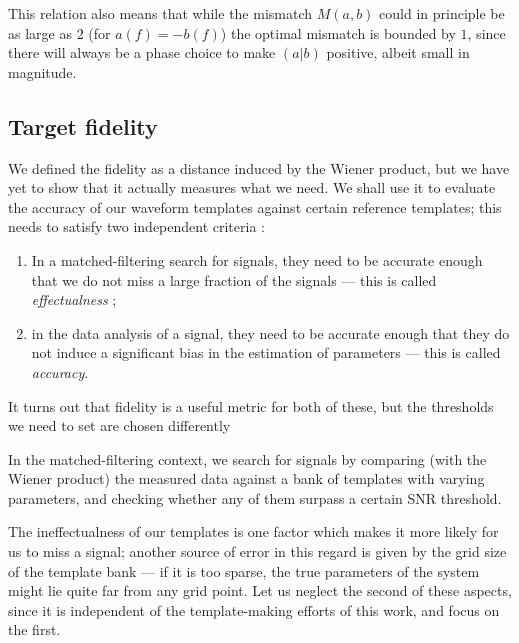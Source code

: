 \documentclass[main.tex]{subfiles}
\begin{document}
This relation also means that while the mismatch \(M(a, b)\) could in principle be as large as \(2\) (for \(a(f) = -b(f)\)) the optimal mismatch is bounded by \(1\), since there will always be a phase choice to make \((a|b)\) positive, albeit small in magnitude.


\subsection{Target fidelity}

We defined the fidelity as a distance induced by the Wiener product, but we have yet to show that it actually measures what we need. 
We shall use it to evaluate the accuracy of our waveform templates against certain reference templates; this needs to satisfy two independent criteria \cite{lindblomModelWaveformAccuracy2008}:

\begin{enumerate}
    \item In a matched-filtering search for signals, they need to be accurate enough that we do not miss a large fraction of the signals --- this is called \emph{effectualness} \cite[]{damourAccuracyEffectualnessClosedform2011};
    \item in the data analysis of a signal, they need to be accurate enough that they do not induce a significant bias in the estimation of parameters --- this is called \emph{accuracy}.
\end{enumerate}

It turns out that fidelity is a useful metric for both of these, but the thresholds we need to set are chosen differently 

In the matched-filtering context, we search for signals by comparing (with the Wiener product) the measured data against a bank of templates with varying parameters, and checking whether any of them surpass a certain \ac{SNR} threshold.

The ineffectualness of our templates is one factor which makes it more likely for us to miss a signal; another source of error in this regard is given by the grid size of the template bank --- if it is too sparse, the true parameters of the system might lie quite far from any grid point.
Let us neglect the second of these aspects, since it is independent of the template-making efforts of this work, and focus on the first. 
\end{document}
